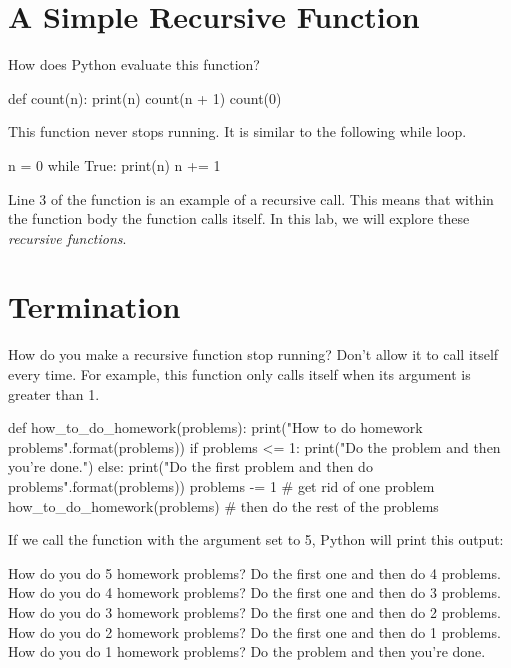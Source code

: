 \documentclass[11pt]{cselabheader}
\begin{document}
\tableofcontents

\pagebreak
{}

\section{A Simple Recursive Function}

How does Python evaluate this function?

\begin{python3code}
def count(n):
    print(n)
    count(n + 1)
count(0)
\end{python3code}

This function never stops running. It is similar to the following while loop.

\begin{python3code}
n = 0
while True:
    print(n)
    n += 1
\end{python3code}

Line 3 of the  function is an example of a
recursive call.  This means that within the function body the function
calls itself. In this lab, we will explore these \textsl{recursive functions}.

\section{Termination}

How do you make a recursive function stop running?  Don't allow it to
call itself every time. For example, this function only calls itself
when its argument  is greater than 1.

\begin{python3code}
def how_to_do_homework(problems):
    print("How to do {} homework problems".format(problems))
    if problems <= 1:
        print("Do the problem and then you're done.")
    else:
        print("Do the first problem and then do {} problems".format(problems))
        problems -= 1  # get rid of one problem
        how_to_do_homework(problems) # then do the rest of the problems
\end{python3code}

If we call the function with the argument  set to 5,
Python will print this output:

\begin{verbatimcode}
How do you do 5 homework problems?
Do the first one and then do 4 problems.
How do you do 4 homework problems?
Do the first one and then do 3 problems.
How do you do 3 homework problems?
Do the first one and then do 2 problems.
How do you do 2 homework problems?
Do the first one and then do 1 problems.
How do you do 1 homework problems?
Do the problem and then you're done.
\end{verbatimcode}
\end{document}
